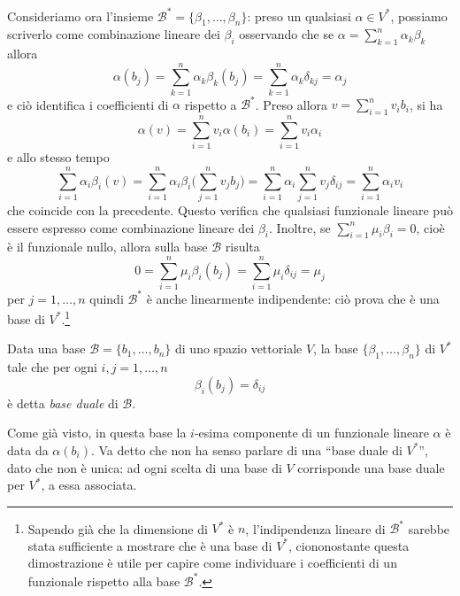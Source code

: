 Consideriamo ora l'insieme $\mathcal B^*=\{\beta_1,\dots,\beta_n\}$: preso un qualsiasi $\alpha\in V^*$, possiamo scriverlo come combinazione lineare dei $\beta_i$ osservando che se $\alpha=\sum_{k=1}^n\alpha_k\beta_k$ allora
\begin{equation}
	\alpha(b_j)=\sum_{k=1}^n\alpha_k\beta_k(b_j)=\sum_{k=1}^n\alpha_k\delta_{kj}=\alpha_j
\end{equation}
e ciò identifica i coefficienti di $\alpha$ rispetto a $\mathcal B^*$.
Preso allora $v=\sum_{i=1}^nv_ib_i$, si ha
\begin{equation}
	\alpha(v)=\sum_{i=1}^nv_i\alpha(b_i)=\sum_{i=1}^nv_i\alpha_i
\end{equation}
e allo stesso tempo
\begin{equation}
	\sum_{i=1}^n\alpha_i\beta_i(v)=\sum_{i=1}^n\alpha_i\beta_i\bigg(\sum_{j=1}^nv_jb_j\bigg)=\sum_{i=1}^n\alpha_i\sum_{j=1}^nv_j\delta_{ij}=\sum_{i=1}^n\alpha_iv_i
\end{equation}
che coincide con la precedente.
Questo verifica che qualsiasi funzionale lineare può essere espresso come combinazione lineare dei $\beta_i$.
Inoltre, se $\sum_{i=1}^n\mu_i\beta_i=0$, cioè è il funzionale nullo, allora sulla base $\mathcal B$ risulta
\begin{equation}
	0=\sum_{i=1}^n\mu_i\beta_i(b_j)=\sum_{i=1}^n\mu_i\delta_{ij}=\mu_j
\end{equation}
per $j=1,\dots,n$ quindi $\mathcal B^*$ è anche linearmente indipendente: ciò prova che è una base di $V^*$.\footnote{
	Sapendo già che la dimensione di $V^*$ è $n$, l'indipendenza lineare di $\mathcal B^*$ sarebbe stata sufficiente a mostrare che è una base di $V^*$, ciononostante questa dimostrazione è utile per capire come individuare i coefficienti di un funzionale rispetto alla base $\mathcal B^*$.
}
\begin{definizione} \label{d:base-duale}
	Data una base $\mathcal B=\{b_1,\dots,b_n\}$ di uno spazio vettoriale $V$, la base $\{\beta_1,\dots,\beta_n\}$ di $V^*$ tale che per ogni $i,j=1,\dots,n$
	\begin{equation}
		\beta_i(b_j)=\delta_{ij}
	\end{equation}
	è detta \emph{base duale} di $\mathcal B$.
\end{definizione}
Come già visto, in questa base la $i$-esima componente di un funzionale lineare $\alpha$ è data da $\alpha(b_i)$.
Va detto che non ha senso parlare di una ``base duale di $V^*$'', dato che non è unica: ad ogni scelta di una base di $V$ corrisponde una base duale per $V^*$, a essa associata.

